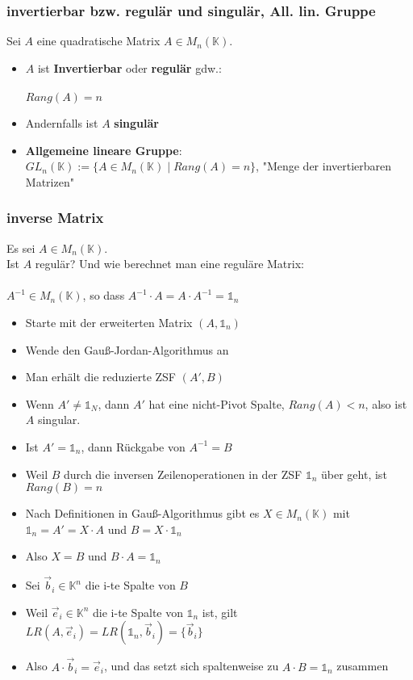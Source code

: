 \documentclass[titlepage]{article}
\newcommand{\K}{\mathbb{K}}
\newcommand{\1}{\mathbb{1}}
\newcommand{\0}{\mathbb{0}}
\begin{document}
				\subsubsection{invertierbar bzw. regulär und singulär,  All. lin. Gruppe}
					Sei $A$ eine quadratische Matrix $A\in M_n(\K)$.
					\begin{itemize}
						\item $A$ ist \textbf{Invertierbar} oder \textbf{regulär} gdw.:\\\\
						$Rang(A)=n$
						\item Andernfalls ist $A$ \textbf{singulär}
						\item \textbf{Allgemeine lineare Gruppe}: $GL_n(\K):=\{A\in M_n(\K)\mid Rang(A)=n\}$, "Menge der invertierbaren Matrizen"
					\end{itemize}
				\subsubsection{inverse Matrix}
					Es sei $A\in M_n(\K)$. \\Ist $A$ regulär? Und wie berechnet man eine reguläre Matrix:\\\\ $A^{-1}\in M_n(\K)$, so dass $A^{-1}\cdot A=A\cdot A^{-1}=\1_n$
					\begin{itemize}
						\item Starte mit der erweiterten Matrix $(A,\1_n)$
						\item Wende den Gauß-Jordan-Algorithmus an
						\item Man erhält die reduzierte ZSF $(A',B)$
						\item Wenn $A'\neq\1_N$, dann $A'$ hat eine nicht-Pivot Spalte, $Rang(A)<n$, also ist $A$ singular.
						\item Ist $A'=\1_n$, dann Rückgabe von $A^{-1}=B$\\
						\item Weil $B$ durch die inversen Zeilenoperationen in der ZSF $\1_n$ über geht, ist $Rang(B)=n$
						\item Nach Definitionen in Gauß-Algorithmus gibt es $X\in M_n(\K)$ mit $\1_n=A'=X\cdot A$ und $B=X\cdot\1_n$
						\item Also $X=B$ und $B\cdot A=\1_n$\\
						\item Sei $\vec{b}_i\in\K^n$ die i-te Spalte von $B$
						\item Weil $\vec{e}_i\in\K^n$ die i-te Spalte von $\1_n$ ist, gilt $LR(A,\vec{e}_i)=LR(\1_n,\vec{b}_i)=\{\vec{b}_i\}$
						\item Also $A\cdot\vec{b}_i=\vec{e}_i$, und das setzt sich spaltenweise zu $A\cdot B=\1_n$ zusammen
					\end{itemize}
\end{document}
